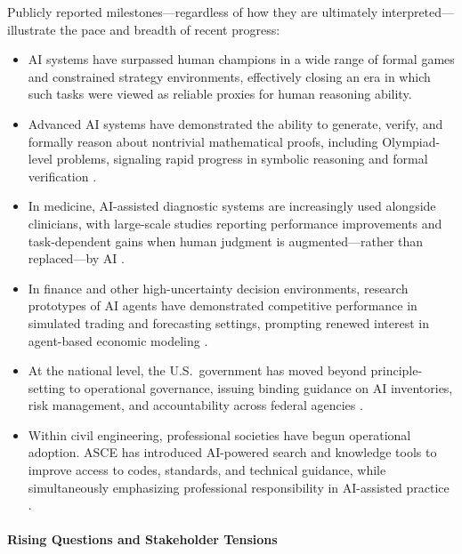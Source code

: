 \documentclass[12pt]{article}
\begin{document}
Publicly reported milestones—regardless of how they are ultimately interpreted—illustrate the pace and breadth of recent progress:
\begin{itemize}
\item AI systems have surpassed human champions in a wide range of formal games and constrained strategy environments, effectively closing an era in which such tasks were viewed as reliable proxies for human reasoning ability.

\item Advanced AI systems have demonstrated the ability to generate, verify, and formally reason about nontrivial mathematical proofs, including Olympiad-level problems, signaling rapid progress in symbolic reasoning and formal verification \cite{deepmind_alphaproof_blog_2024,hubert_etal_2025_alphaproof_nature}.

\item In medicine, AI-assisted diagnostic systems are increasingly used alongside clinicians, with large-scale studies reporting performance improvements and task-dependent gains when human judgment is augmented—rather than replaced—by AI \cite{yu_etal_2024_natmed_radiologists_ai_assistance,fda_ai_enabled_medical_devices_list_2026}.

\item In finance and other high-uncertainty decision environments, research prototypes of AI agents have demonstrated competitive performance in simulated trading and forecasting settings, prompting renewed interest in agent-based economic modeling \cite{ding_etal_2024_llm_financial_trading_agents_survey,lopez_lira_etal_2025_can_llms_trade}.

\item At the national level, the U.S.\ government has moved beyond principle-setting to operational governance, issuing binding guidance on AI inventories, risk management, and accountability across federal agencies \cite{omb_m_24_10_2024,cio_council_ai_inventory_guidance_2024}.

\item Within civil engineering, professional societies have begun operational adoption. ASCE has introduced AI-powered search and knowledge tools to improve access to codes, standards, and technical guidance, while simultaneously emphasizing professional responsibility in AI-assisted practice \cite{asce_ps573_2024,asce_ai_search_tools_2025}.
\end{itemize}

\paragraph{Rising Questions and Stakeholder Tensions}
\end{document}
